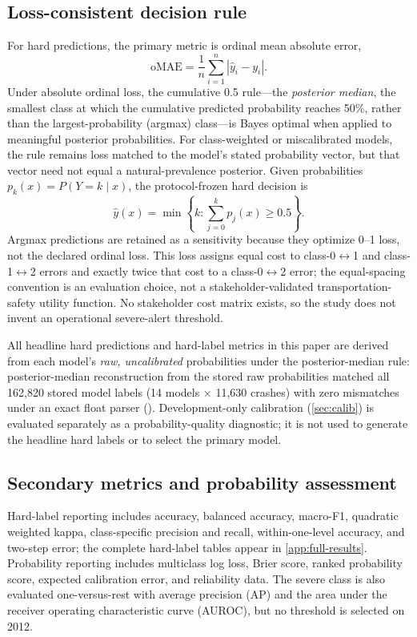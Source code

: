 \documentclass[11pt,letterpaper]{article}
\newcommand{\artifact}[1]{\begingroup\urlstyle{tt}\path{#1}\endgroup}
\newcommand{\om}{\mathrm{oMAE}}
\begin{document}
\subsection{Loss-consistent decision rule}
\label{sec:decision-rule}
For hard predictions, the primary metric is ordinal mean absolute error,
\begin{equation}
\om = \frac{1}{n}\sum_{i=1}^{n}\left|\hat{y}_i-y_i\right|.
\end{equation}
Under absolute ordinal loss, the cumulative 0.5 rule---the \emph{posterior median}, the smallest class at which the cumulative predicted probability reaches 50\%, rather than the largest-probability (argmax) class---is Bayes optimal when applied to meaningful posterior probabilities. For class-weighted or miscalibrated models, the rule remains loss matched to the model's stated probability vector, but that vector need not equal a natural-prevalence posterior. Given probabilities $p_k(x)=P(Y=k\mid x)$, the protocol-frozen hard decision is
\begin{equation}
\hat{y}(x)=\min\left\{k:\sum_{j=0}^{k}p_j(x)\ge 0.5\right\}.
\end{equation}
Argmax predictions are retained as a sensitivity because they optimize 0--1 loss, not the declared ordinal loss. This loss assigns equal cost to class-0$\leftrightarrow$1 and class-1$\leftrightarrow$2 errors and exactly twice that cost to a class-0$\leftrightarrow$2 error; the equal-spacing convention is an evaluation choice, not a stakeholder-validated transportation-safety utility function. No stakeholder cost matrix exists, so the study does not invent an operational severe-alert threshold.

All headline hard predictions and hard-label metrics in this paper are derived from each model's \emph{raw, uncalibrated} probabilities under the posterior-median rule: posterior-median reconstruction from the stored raw probabilities matched all 162,820 stored model labels (14 models $\times$ 11,630 crashes) with zero mismatches under an exact float parser (\artifact{experiment/raw_vs_calibrated_decisions.json}). Development-only calibration (\cref{sec:calib}) is evaluated separately as a probability-quality diagnostic; it is not used to generate the headline hard labels or to select the primary model.

\subsection{Secondary metrics and probability assessment}
\label{sec:metrics}
Hard-label reporting includes accuracy, balanced accuracy, macro-F1, quadratic weighted kappa, class-specific precision and recall, within-one-level accuracy, and two-step error; the complete hard-label tables appear in \cref{app:full-results}. Probability reporting includes multiclass log loss, Brier score, ranked probability score, expected calibration error, and reliability data. The severe class is also evaluated one-versus-rest with average precision (AP) and the area under the receiver operating characteristic curve (AUROC), but no threshold is selected on 2012.
\end{document}
